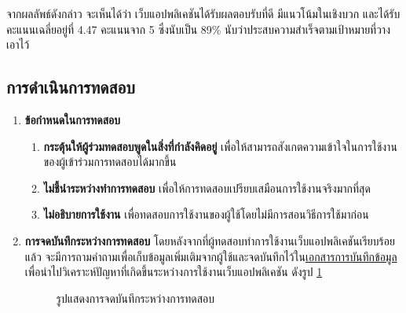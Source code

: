 \begin{enumerate}
          จากผลลัพธ์ดังกล่าว จะเห็นได้ว่า เว็บแอปพลิเคชันได้รับผลตอบรับที่ดี มีแนวโน้มในเชิงบวก และได้รับคะแนนเฉลี่ยอยู่ที่ 4.47 คะแนนจาก 5 ซึ่งนับเป็น 89\%
          นับว่าประสบความสำเร็จตามเป้าหมายที่วางเอาไว้

\end{enumerate}
\subsection{การดำเนินการทดสอบ}
\begin{enumerate}
    \item \textbf{ข้อกำหนดในการทดสอบ}
          \begin{enumerate}
              \item \textbf{กระตุ้นให้ผู้ร่วมทดสอบพูดในสิ่งที่กำลังคิดอยู่} เพื่อให้สามารถสังเกตความเข้าใจในการใช้งานของผู้เข้าร่วมการทดสอบได้มากขึ้น
              \item \textbf{ไม่ชี้นำระหว่างทำการทดสอบ} เพื่อให้การทดสอบเปรียบเสมือนการใช้งานจริงมากที่สุด
              \item \textbf{ไม่อธิบายการใช้งาน} เพื่อทดสอบการใช้งานของผู้ใช้โดยไม่มีการสอนวิธีการใช้มาก่อน
          \end{enumerate}
    \item \textbf{การจดบันทึกระหว่างการทดสอบ} โดยหลังจากที่ผู้ทดสอบทำการใช้งานเว็บแอปพลิเคชันเรียบร้อยแล้ว จะมีการถามคำถามเพื่อเก็บข้อมูลเพิ่มเติมจากผู้ใช้และจดบันทึกไว้ใน\href{https://www.figma.com/board/bGhe1nmClqCX1Vsv05SJr0/Usability-Test-%232-(MVP-Demo)?node-id=0%3A1&t=qcWQsdAVehtBMlXn-1}{เอกสารการบันทึกข้อมูล} เพื่อนำไปวิเคราะห์ปัญหาที่เกิดขึ้นระหว่างการใช้งานเว็บแอปพลิเคชัน ดังรูป \ref{fig:NoteTaking}
          \begin{figure}[H]\centering
              \caption{รูปแสดงการจดบันทึกระหว่างการทดสอบ}\label{fig:NoteTaking}
          \end{figure}
\end{enumerate}
